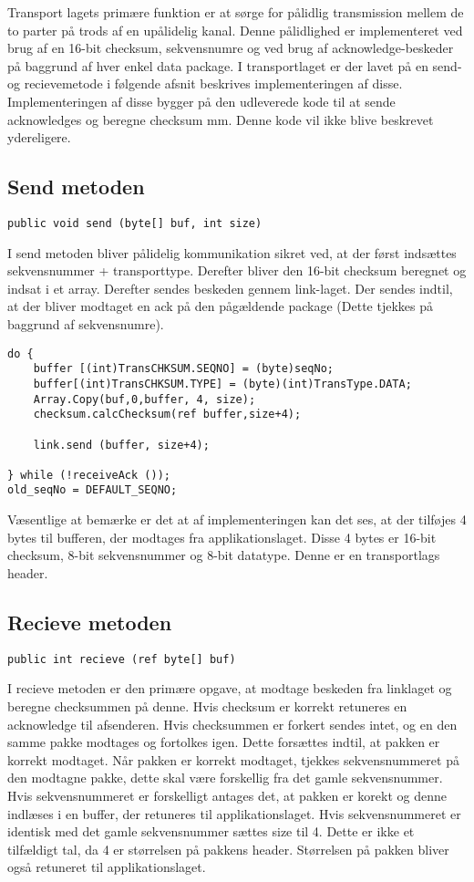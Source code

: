 Transport lagets primære funktion er at sørge for pålidlig transmission mellem de to parter på trods af en upålidelig kanal. 
Denne pålidlighed er implementeret ved brug af en 16-bit checksum, sekvensnumre og ved brug af acknowledge-beskeder på baggrund af hver enkel data package. 
I transportlaget er der lavet på en send- og recievemetode i følgende afsnit beskrives implementeringen af disse. Implementeringen af disse bygger på den udleverede kode til at sende acknowledges og beregne checksum mm. Denne kode vil ikke blive beskrevet ydereligere.

\subsection{Send metoden}
\begin{verbatim}
public void send (byte[] buf, int size)
\end{verbatim}
I send metoden bliver pålidelig kommunikation sikret ved, at der først indsættes sekvensnummer + transporttype. Derefter bliver den 16-bit checksum beregnet og indsat i et array. Derefter sendes beskeden gennem link-laget. Der sendes indtil, at der bliver modtaget en ack på den pågældende package (Dette tjekkes på baggrund af sekvensnumre).
\begin{lstlisting}
do {
	buffer [(int)TransCHKSUM.SEQNO] = (byte)seqNo;
	buffer[(int)TransCHKSUM.TYPE] = (byte)(int)TransType.DATA;
	Array.Copy(buf,0,buffer, 4, size);
	checksum.calcChecksum(ref buffer,size+4);

	link.send (buffer, size+4);

} while (!receiveAck ());	
old_seqNo = DEFAULT_SEQNO;	
\end{lstlisting}

\noindent Væsentlige at bemærke er det at af implementeringen kan det ses, at der tilføjes 4 bytes til bufferen, der modtages fra applikationslaget. Disse 4 bytes er 16-bit checksum, 8-bit sekvensnummer og 8-bit datatype. Denne er en transportlags header. 

\subsection{Recieve metoden}
\begin{verbatim}
public int recieve (ref byte[] buf)
\end{verbatim}

I recieve metoden er den primære opgave, at modtage beskeden fra linklaget og beregne checksummen på denne. Hvis checksum er korrekt retuneres en acknowledge til afsenderen. Hvis checksummen er forkert sendes intet, og en den samme pakke modtages og fortolkes igen. Dette forsættes indtil, at pakken er korrekt modtaget. Når pakken er korrekt modtaget, tjekkes sekvensnummeret på den modtagne pakke, dette skal være forskellig fra det gamle sekvensnummer. Hvis sekvensnummeret er forskelligt antages det, at pakken er korekt og denne indlæses i en buffer, der retuneres til applikationslaget. Hvis sekvensnummeret er identisk med det gamle sekvensnummer sættes size til 4. Dette er ikke et tilfældigt tal, da 4 er størrelsen på pakkens header. Størrelsen på pakken bliver også retuneret til applikationslaget.

